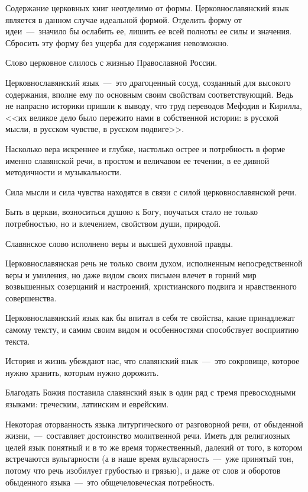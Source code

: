 \documentclass[11pt,a4paper,oneside]{memoir}
\begin{document}
    Содержание церковных книг неотделимо от формы. Церковнославянский язык является в данном случае идеальной формой. Отделить форму от идеи~---~значило бы ослабить ее, лишить ее всей полноты ее силы и значения. Сбросить эту форму без ущерба для содержания невозможно.
    
    Слово церковное слилось с жизнью Православной России.
    
    Церковнославянский язык~---~это драгоценный сосуд, созданный для высокого содержания, вполне ему по основным своим свойствам соответствующий. Ведь не напрасно историки пришли к выводу, что труд переводов Мефодия и Кирилла, <<их великое дело было пережито нами в собственной истории: в русской мысли, в русском чувстве, в русском подвиге>>.
    
    Насколько вера искреннее и глубже, настолько острее и потребность в форме именно славянской речи, в простом и величавом ее течении, в ее дивной методичности и музыкальности.
    
    Сила мысли и сила чувства находятся в связи с силой церковнославянской речи.
    
    Быть в церкви, возноситься душою к Богу, поучаться стало не только потребностью, но и влечением, свойством души, природой.
    
    Славянское слово исполнено веры и высшей духовной правды.
    
    Церковнославянская речь не только своим духом, исполненным непосредственной веры и умиления, но даже видом своих письмен влечет в горний мир возвышенных созерцаний и настроений, христианского подвига и нравственного совершенства.
    
    Церковнославянский язык как бы впитал в себя те свойства, какие принадлежат самому тексту, и самим своим видом и особенностями способствует восприятию текста.
    
    История и жизнь убеждают нас, что славянский язык~---~это сокровище, которое нужно хранить, которым нужно дорожить.
    
    Благодать Божия поставила славянский язык в один ряд с тремя превосходными языками: греческим, латинским и еврейским.
    
    Некоторая оторванность языка литургического от разговорной речи, от обыденной жизни,~---~составляет достоинство молитвенной речи. Иметь для религиозных целей язык понятный и в то же время торжественный, далекий от того, в котором встречаются вульгарности (а в наше время вульгарность~---~уже принятый тон, потому что речь изобилует грубостью и грязью), и даже от слов и оборотов обыденного языка~---~это общечеловеческая потребность.
    
\end{document}
